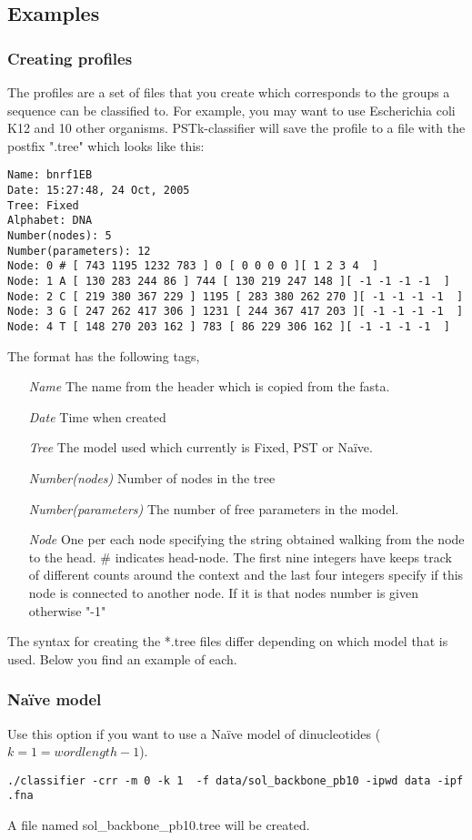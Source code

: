 \documentclass[]{article}
\begin{document}
\subsection{Examples}
\subsubsection{Creating profiles}
The profiles are a set of files that you create which corresponds to the
groups a sequence can be classified to. For example, you may want to use
Escherichia coli K12 and 10 other organisms. PSTk-classifier will save the
profile to a file with the postfix ".tree" which looks like this: 
\begin{verbatim}
Name: bnrf1EB
Date: 15:27:48, 24 Oct, 2005
Tree: Fixed
Alphabet: DNA
Number(nodes): 5
Number(parameters): 12
Node: 0 # [ 743 1195 1232 783 ] 0 [ 0 0 0 0 ][ 1 2 3 4  ]
Node: 1 A [ 130 283 244 86 ] 744 [ 130 219 247 148 ][ -1 -1 -1 -1  ]
Node: 2 C [ 219 380 367 229 ] 1195 [ 283 380 262 270 ][ -1 -1 -1 -1  ]
Node: 3 G [ 247 262 417 306 ] 1231 [ 244 367 417 203 ][ -1 -1 -1 -1  ]
Node: 4 T [ 148 270 203 162 ] 783 [ 86 229 306 162 ][ -1 -1 -1 -1  ]
\end{verbatim}
The format has the following tags,
\begin{itemize}
\item[\textit{Name}] The name from the header which is copied from the fasta. 
\item[\textit{Date}] Time when created
\item[\textit{Tree}] The model used which currently is Fixed,  PST or Na\"ive.
\item[\textit{Number(nodes)}] Number of nodes in the tree
\item[\textit{Number(parameters)}] The number of free parameters in the model.
\item[\textit{Node}] One per each node specifying the string obtained
  walking from the node to the head. \# indicates head-node. The first nine
  integers have keeps track of different counts around the context and the
  last four integers specify if this node is connected to another node. If
  it is that nodes number is given otherwise "-1"
\end{itemize}
The syntax for creating the *.tree files differ depending on
which model that is used. Below you find an example of each.

\subsubsection{Na\"ive model}
Use this option if you want to use a Na\"ive model of dinucleotides ($k =
1 = wordlength - 1$). 
\begin{verbatim}
./classifier -crr -m 0 -k 1  -f data/sol_backbone_pb10 -ipwd data -ipf .fna
\end{verbatim}
A file named sol\_backbone\_pb10.tree will be created.
\end{document}
